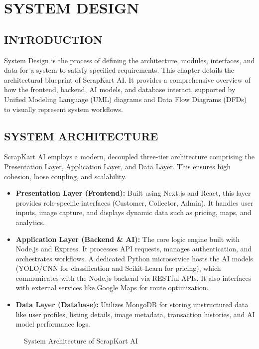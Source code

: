 \chapter{SYSTEM DESIGN}

\section{INTRODUCTION}
System Design is the process of defining the architecture, modules, interfaces, and data for a system to satisfy specified requirements. This chapter details the architectural blueprint of ScrapKart AI. It provides a comprehensive overview of how the frontend, backend, AI models, and database interact, supported by Unified Modeling Language (UML) diagrams and Data Flow Diagrams (DFDs) to visually represent system workflows.

\section{SYSTEM ARCHITECTURE}
ScrapKart AI employs a modern, decoupled three-tier architecture comprising the Presentation Layer, Application Layer, and Data Layer. This ensures high cohesion, loose coupling, and scalability.
\begin{itemize}
    \item \textbf{Presentation Layer (Frontend):} Built using Next.js and React, this layer provides role-specific interfaces (Customer, Collector, Admin). It handles user inputs, image capture, and displays dynamic data such as pricing, maps, and analytics.
    \item \textbf{Application Layer (Backend \& AI):} The core logic engine built with Node.js and Express. It processes API requests, manages authentication, and orchestrates workflows. A dedicated Python microservice hosts the AI models (YOLO/CNN for classification and Scikit-Learn for pricing), which communicates with the Node.js backend via RESTful APIs. It also interfaces with external services like Google Maps for route optimization.
    \item \textbf{Data Layer (Database):} Utilizes MongoDB for storing unstructured data like user profiles, listing details, image metadata, transaction histories, and AI model performance logs.
\end{itemize}

\begin{figure}[H]
    \centering
    \vspace{5cm} %
    \caption{System Architecture of ScrapKart AI}
    \label{fig:sys_arch}
\end{figure}

